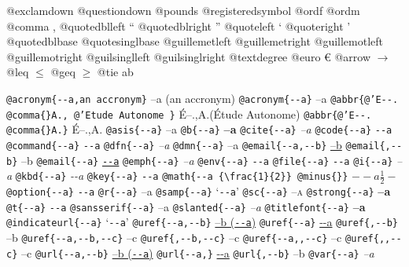 \documentclass{book}
\begin{document}
\begin{titlepage}
@exclamdown \textexclamdown{}
@questiondown \textquestiondown{}
@pounds \textsterling{}
@registeredsymbol \circledR{}
@ordf \textordfeminine{}
@ordm \textordmasculine{}
@comma ,
@quotedblleft \textquotedblleft{}
@quotedblright \textquotedblright{}
@quoteleft \textquoteleft{}
@quoteright \textquoteright{}
@quotedblbase \quotedblbase{}
@quotesinglbase \quotesinglbase{}
@guillemetleft \guillemotleft{}
@guillemetright \guillemotright{}
@guillemotleft \guillemotleft{}
@guillemotright \guillemotright{}
@guilsinglleft \guilsinglleft{}
@guilsinglright \guilsinglright{}
@textdegree \textdegree{}
@euro \euro{}
@arrow $\rightarrow{}$
@leq $\leq{}$
@geq $\geq{}$
@tie a\hbox{}b

\texttt{@acronym\{{-}{-}a,an accronym\}} --a (an accronym)
\texttt{@acronym\{{-}{-}a\}} --a
\texttt{@abbr\{@'E{-}{-}. @comma\{\}A., @'Etude Autonome \}} \'{E}--.\@ ,A.\@ (\'{E}tude Autonome)
\texttt{@abbr\{@'E{-}{-}. @comma\{\}A.\}} \'{E}--.\@ ,A.\@
\texttt{@asis\{{-}{-}a\}} --a
\texttt{@b\{{-}{-}a\}} \textbf{--a}
\texttt{@cite\{{-}{-}a\}} \textit{--a}
\texttt{@code\{{-}{-}a\}} \texttt{{-}{-}a}
\texttt{@command\{{-}{-}a\}} \texttt{{-}{-}a}
\texttt{@dfn\{{-}{-}a\}} \emph{--a}
\texttt{@dmn\{{-}{-}a\}} --a
\texttt{@email\{{-}{-}a,{-}{-}b\}} \href{mailto:--a}{--b}
\texttt{@email\{,{-}{-}b\}} --b
\texttt{@email\{{-}{-}a\}} \href{mailto:--a}{\nolinkurl{--a}}
\texttt{@emph\{{-}{-}a\}} \emph{--a}
\texttt{@env\{{-}{-}a\}} \texttt{{-}{-}a}
\texttt{@file\{{-}{-}a\}} \texttt{{-}{-}a}
\texttt{@i\{{-}{-}a\}} \textit{--a}
\texttt{@kbd\{{-}{-}a\}} {\ttfamily\textsl{{-}{-}a}}
\texttt{@key\{{-}{-}a\}} \texttt{{-}{-}a}
\texttt{@math\{{-}{-}a \{\textbackslash{}frac\{1\}\{2\}\} @minus\{\}\}} $--a {\frac{1}{2}} -$
\texttt{@option\{{-}{-}a\}} \texttt{{-}{-}a}
\texttt{@r\{{-}{-}a\}} \textrm{--a}
\texttt{@samp\{{-}{-}a\}} `\texttt{{-}{-}a}'
\texttt{@sc\{{-}{-}a\}} \textsc{--a}
\texttt{@strong\{{-}{-}a\}} \textbf{--a}
\texttt{@t\{{-}{-}a\}} \texttt{{-}{-}a}
\texttt{@sansserif\{{-}{-}a\}} \textsf{--a}
\texttt{@slanted\{{-}{-}a\}} \textsl{--a}
\texttt{@titlefont\{{-}{-}a\}} {\huge \bfseries --a}
\texttt{@indicateurl\{{-}{-}a\}} `\texttt{{-}{-}a}'
\texttt{@uref\{{-}{-}a,{-}{-}b\}} \href{--a}{--b (\nolinkurl{--a})}
\texttt{@uref\{{-}{-}a\}} \url{--a}
\texttt{@uref\{,{-}{-}b\}} --b
\texttt{@uref\{{-}{-}a,{-}{-}b,{-}{-}c\}} --c
\texttt{@uref\{,{-}{-}b,{-}{-}c\}} --c
\texttt{@uref\{{-}{-}a,,{-}{-}c\}} --c
\texttt{@uref\{,,{-}{-}c\}} --c
\texttt{@url\{{-}{-}a,{-}{-}b\}} \href{--a}{--b (\nolinkurl{--a})}
\texttt{@url\{{-}{-}a,\}} \url{--a}
\texttt{@url\{,{-}{-}b\}} --b
\texttt{@var\{{-}{-}a\}} \emph{--a}

\end{titlepage}
\end{document}
